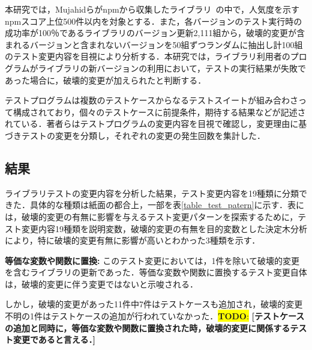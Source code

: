 \documentclass[uplatex,dvipdfmx,a4paper,twocolumn,base=11pt,jbase=11pt,ja=standard]{bxjsarticle}  %
\newcommand{\todo}[1]{\colorbox{yellow}{{\bf TODO}:}{\color{red} {\textbf{[#1]}}}}
\begin{document}
本研究では，Mujahidらがnpmから収集したライブラリ~\cite{Mujahid}の中で，人気度を示すnpmスコア上位500件以内を対象とする．また，各バージョンのテスト実行時の成功率が100％であるライブラリのバージョン更新2,111組から，破壊的変更が含まれるバージョンと含まれないバージョンを50組ずつランダムに抽出し計100組のテスト変更内容を目視により分析する．本研究では，ライブラリ利用者のプログラムがライブラリの新バージョンの利用において，テストの実行結果が失敗であった場合に，破壊的変更が加えられたと判断する．

%
%

テストプログラムは複数のテストケースからなるテストスイートが組み合わさって構成されており，個々のテストケースに前提条件，期待する結果などが記述されている．著者らはテストプログラムの変更内容を目視で確認し，変更理由に基づきテストの変更を分類し，それぞれの変更の発生回数を集計した．



\subsection{結果}

ライブラリテストの変更内容を分析した結果，テスト変更内容を19種類に分類できた．具体的な種類は紙面の都合上，一部を表\ref{table_test_patern}に示す．表には，破壊的変更の有無に影響を与えるテスト変更パターンを探索するために，テスト変更内容19種類を説明変数，破壊的変更の有無を目的変数とした決定木分析により，特に破壊的変更有無に影響が高いとわかった3種類を示す．

\noindent\textbf{等価な変数や関数に置換: }このテスト変更においては，1件を除いて破壊的変更を含むライブラリの更新であった．等価な変数や関数に置換するテスト変更自体は，破壊的変更に伴う変更ではないと示唆される．

しかし，破壊的変更があった11件中7件はテストケースも追加され，破壊的変更不明の1件はテストケースの追加が行われていなかった．\todo{テストケースの追加と同時に，等価な変数や関数に置換された時，破壊的変更に関係するテスト変更であると言える．}
\end{document}
